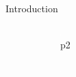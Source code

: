 \documentclass[]{beamer}
\begin{document}
\begin{frame}[t]{}
\begin{columns}[t]
\begin{column}{0.45\linewidth}
\begin{block}{Introduction}
\begin{figure}[h]
\begin{subfigure}[t]{0.3\linewidth}
              \includegraphics[width=\linewidth]{trimer-crys-p2}
            \caption{p2}
            \label{fig:crystals p2}
          \end{subfigure}
          \begin{subfigure}[t]{0.3\linewidth}
              \includegraphics[width=\linewidth]{trimer-crys-p2gg}

\end{subfigure}
\end{figure}
\end{block}
\end{column}
\end{columns}
\end{frame}
\end{document}
